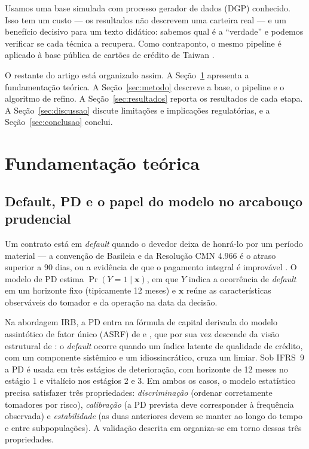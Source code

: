 \documentclass[11pt,a4paper]{article}
\begin{document}
Usamos uma base simulada com processo gerador de dados (DGP) conhecido. Isso tem um custo --- os resultados não descrevem uma carteira real --- e um benefício decisivo para um texto didático: sabemos qual é a ``verdade'' e podemos verificar se cada técnica a recupera. Como contraponto, o mesmo pipeline é aplicado à base pública de cartões de crédito de Taiwan \citep{yeh2009}.

O restante do artigo está organizado assim. A Seção~\ref{sec:teoria} apresenta a fundamentação teórica. A Seção~\ref{sec:metodo} descreve a base, o pipeline e o algoritmo de refino. A Seção~\ref{sec:resultados} reporta os resultados de cada etapa. A Seção~\ref{sec:discussao} discute limitações e implicações regulatórias, e a Seção~\ref{sec:conclusao} conclui.

\section{Fundamentação teórica}
\label{sec:teoria}

\subsection{Default, PD e o papel do modelo no arcabouço prudencial}

Um contrato está em \emph{default} quando o devedor deixa de honrá-lo por um período material --- a convenção de Basileia e da Resolução CMN 4.966 é o atraso superior a 90 dias, ou a evidência de que o pagamento integral é improvável \citep{bcbs2006,cmn4966}. O modelo de PD estima $\Pr(Y=1 \mid \mathbf{x})$, em que $Y$ indica a ocorrência de \emph{default} em um horizonte fixo (tipicamente 12 meses) e $\mathbf{x}$ reúne as características observáveis do tomador e da operação na data da decisão.

Na abordagem IRB, a PD entra na fórmula de capital derivada do modelo assintótico de fator único (ASRF) de \citet{gordy2003} e \citet{vasicek2002}, que por sua vez descende da visão estrutural de \citet{merton1974}: o \emph{default} ocorre quando um índice latente de qualidade de crédito, com um componente sistêmico e um idiossincrático, cruza um limiar. Sob IFRS~9 a PD é usada em três estágios de deterioração, com horizonte de 12 meses no estágio 1 e vitalício nos estágios 2 e 3. Em ambos os casos, o modelo estatístico precisa satisfazer três propriedades: \emph{discriminação} (ordenar corretamente tomadores por risco), \emph{calibração} (a PD prevista deve corresponder à frequência observada) e \emph{estabilidade} (as duas anteriores devem se manter ao longo do tempo e entre subpopulações). A validação descrita em \citet{bcbs2005} organiza-se em torno dessas três propriedades.
\end{document}
